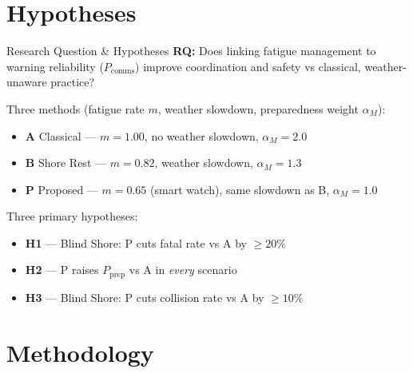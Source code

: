 \documentclass[aspectratio=169]{beamer}
\begin{document}
\section{Hypotheses}

\begin{frame}{Research Question \& Hypotheses}
    \textbf{RQ:} Does linking fatigue management to warning reliability ($P_{\text{comms}}$) improve coordination and safety vs classical, weather-unaware practice?

    \vspace{0.5em}
    Three methods (fatigue rate $m$, weather slowdown, preparedness weight $\alpha_M$):
    \begin{itemize}
        \item \textbf{A} Classical --- $m=1.00$, no weather slowdown, $\alpha_M=2.0$
        \item \textbf{B} Shore Rest --- $m=0.82$, weather slowdown, $\alpha_M=1.3$
        \item \textbf{P} Proposed --- $m=0.65$ (smart watch), same slowdown as B, $\alpha_M=1.0$
    \end{itemize}

    \vspace{0.35em}
    Three primary hypotheses:
    \begin{itemize}
        \item \textbf{H1} --- Blind Shore: P cuts fatal rate vs A by ${\geq}20\%$
        \item \textbf{H2} --- P raises $P_{\text{prep}}$ vs A in \emph{every} scenario
        \item \textbf{H3} --- Blind Shore: P cuts collision rate vs A by ${\geq}10\%$
    \end{itemize}
\end{frame}

\section{Methodology}
\end{document}
